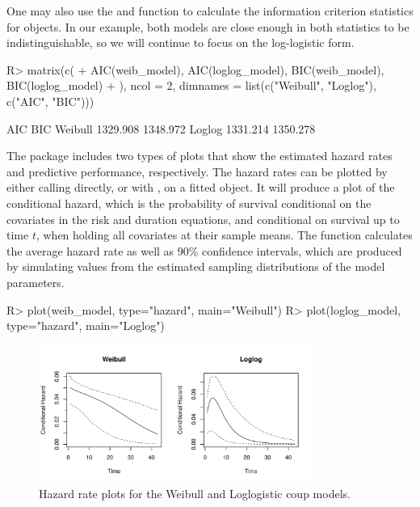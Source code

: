 \documentclass[article]{jss}
\begin{document}
One may also use the  and  function to calculate the
information criterion statistics for  objects. In our
example, both models are close enough in both statistics to be
indistinguishable, so we will continue to focus on the log-logistic
form.

\begin{CodeChunk}
\begin{CodeInput}
R> matrix(c(
+    AIC(weib_model), AIC(loglog_model), BIC(weib_model), BIC(loglog_model)
+    ), ncol = 2, dimnames = list(c("Weibull", "Loglog"), c("AIC", "BIC")))
\end{CodeInput}
\begin{CodeOutput}
             AIC      BIC
Weibull 1329.908 1348.972
Loglog  1331.214 1350.278
\end{CodeOutput}
\end{CodeChunk}

The package includes two types of plots that show the estimated hazard rates and 
predictive performance, respectively. The hazard rates can be plotted by either 
calling  directly, or with , on
a fitted  object. It will produce a plot of the conditional hazard, which is the probability of survival conditional on the covariates in the risk and
duration equations, and conditional on survival up to time \(t\), when holding
all covariates at their sample means. The
function calculates the average hazard rate as well as 90\% confidence
intervals, which are produced by simulating values from the estimated
sampling distributions of the model parameters. 

\begin{CodeChunk}
\begin{CodeInput}
R> plot(weib_model,   type="hazard", main="Weibull")
R> plot(loglog_model, type="hazard", main="Loglog")
\end{CodeInput}
\end{CodeChunk}

\begin{figure}
\begin{center}
\includegraphics[width=0.8\textwidth]{graphics/hazard-rates.pdf}
\caption{Hazard rate plots for the Weibull and Loglogistic coup models.}
\label{hazard-ex}
\end{center}
\end{figure}
\end{document}
